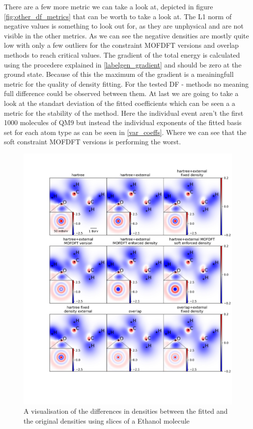 There are a few more metric we can take a look at, depicted in figure \ref{fig:other_df_metrics} that can be worth to take a look at. The L1 norm of negative values is something to look out for, as they are unphysical and are not visible in the other metrics. As we can see the negative densities are mostly quite low with only a few outliers for the constraint MOFDFT versions and overlap methods to reach critical values. The gradient of the total energy is calculated using the procedere explained in \ref{labelgen_gradient} and should be zero at the ground state. Because of this the maximum of the gradient is a meainingfull metric for the quality of density fitting. For the tested DF - methods no meaning full difference could be observed between them. At last we are going to take a look at the standart deviation of the fitted coefficients which can be seen a a metric for the stability of the method. Here the individual event aren't the first 1000 molecules of QM9 but instead the individual exponents of the fitted basis set for each atom type as can be seen in \ref{var_coeffs}. Where we can see that the soft constraint MOFDFT versions is performing the worst.
\begin{figure}
    \centering
    \includegraphics[width=1\textwidth]{chapters/results/results_images/density_fitting_slices_new}
    \caption{A visualisation of the differences in densities between the fitted and the original densities using slices of a Ethanol molecule}
    \label{fig:density_slices_df}
\end{figure}
